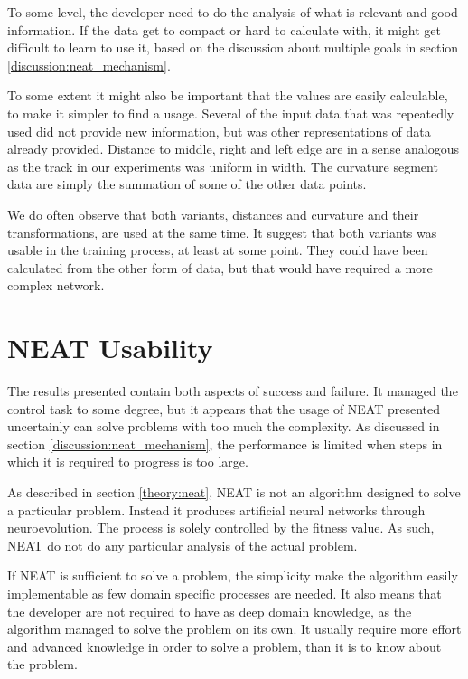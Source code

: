 To some level, the developer need to do the analysis of what is relevant and good information. If the data get to compact or hard to calculate with, it might get difficult to learn to use it, based on the discussion about multiple goals in section \ref{discussion:neat_mechanism}.

To some extent it might also be important that the values are easily calculable, to make it simpler to find a usage. Several of the input data that was repeatedly used did not provide new information, but was other representations of data already provided. Distance to middle, right and left edge are in a sense analogous as the track in our experiments was uniform in width. The curvature segment data are simply the summation of some of the other data points.

We do often observe that both variants, distances and curvature and their transformations, are used at the same time. It suggest that both variants was usable in the training process, at least at some point. They could have been calculated from the other form of data, but that would have required a more complex network.

\section{NEAT Usability}

The results presented contain both aspects of success and failure. It managed the control task to some degree, but it appears that the usage of NEAT presented uncertainly can solve problems with too much the complexity. As discussed in section \ref{discussion:neat_mechanism}, the performance is limited when steps in which it is required to progress is too large.

As described in section \ref{theory:neat}, NEAT is not an algorithm designed to solve a particular problem. Instead it produces artificial neural networks through neuroevolution. The process is solely controlled by the fitness value. As such, NEAT do not do any particular analysis of the actual problem. 

If NEAT is sufficient to solve a problem, the simplicity make the algorithm easily implementable as few domain specific processes are needed. It also means that the developer are not required to have as deep domain knowledge, as the algorithm managed to solve the problem on its own. It usually require more effort and advanced knowledge in order to solve a problem, than it is to know about the problem.

